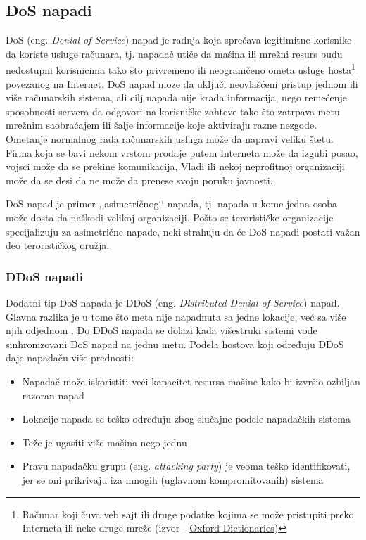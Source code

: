\documentclass[a4paper]{article}
\theoremstyle{break}
\begin{document}
{\subsection{DoS napadi}
\label{subsec:DoS}

DoS (eng. {\em Denial-of-Service}) napad je radnja koja sprečava legitimitne korisnike da koriste usluge računara, tj. napadač utiče da mašina ili mrežni resurs  budu nedostupni korisnicima tako što privremeno ili neograničeno ometa usluge hosta\footnote{Računar koji čuva veb sajt ili druge podatke kojima se može pristupiti preko Interneta ili neke druge mreže (izvor - \href{https://en.oxforddictionaries.com/definition/host}{Oxford Dictionaries})} povezanog na Internet. DoS napad moze da uključi neovlašćeni pristup jednom ili više računarskih sistema, ali cilj napada nije krađa informacija, nego remećenje sposobnosti servera da odgovori na korisničke zahteve tako što zatrpava metu mrežnim saobraćajem ili šalje informacije koje aktiviraju razne nezgode. Ometanje normalnog rada računarskih usluga može da napravi veliku štetu. Firma koja se bavi nekom vrstom prodaje putem Interneta može da izgubi posao, vojsci može da se prekine komunikacija, Vladi ili nekoj neprofitnoj organizaciji može da se desi da ne može da prenese svoju poruku javnosti.

DoS napad je primer ,,asimetričnog‘‘ napada, tj. napada u kome jedna osoba može dosta da naškodi velikoj organizaciji. Pošto se terorističke organizacije specijalizuju za asimetrične napade, neki strahuju da će DoS napadi postati važan deo terorističkog oružja.

\subsubsection{DDoS napadi}
\label{subsubsec:DDoS}

Dodatni tip DoS napada je DDoS (eng. {\em Distributed Denial-of-Service}) napad. Glavna razlika je u tome što meta nije napadnuta sa jedne lokacije, već sa više njih odjednom \cite{ddos}. Do DDoS napada se dolazi kada višestruki sistemi vode sinhronizovani DoS napad na jednu metu. Podela hostova koji određuju DDoS daje napadaču više prednosti:
\begin{itemize}
\item Napadač može iskoristiti veći kapacitet resursa mašine kako bi izvršio ozbiljan razoran napad
\item Lokacije napada se teško određuju zbog slučajne podele napadačkih sistema
\item Teže je ugasiti više mašina nego jednu
\item Pravu napadačku grupu (eng. {\em attacking party}) je veoma teško identifikovati, jer se oni prikrivaju iza mnogih (uglavnom kompromitovanih) sistema
\end{itemize}

}
\end{document}
